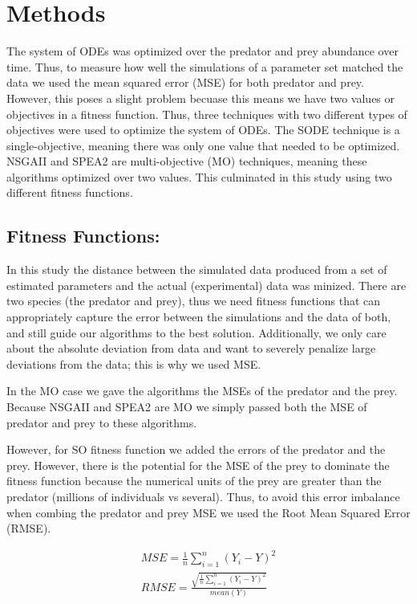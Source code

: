 \documentclass[twocolumn, 12pt]{article}
\begin{document}
\section{Methods}

The system of ODEs was optimized over the predator and prey abundance over time. Thus, to measure how well the simulations of a parameter set matched the data we used the mean squared error (MSE) for both predator and prey. However, this poses a slight problem becuase this means we have two values or objectives in a fitness function. Thus, three techniques with two different types of objectives were used to optimize the system of ODEs. The SODE technique is a single-objective, meaning there was only one value that needed to be optimized. NSGAII and SPEA2 are multi-objective (MO) techniques, meaning these algorithms optimized over two values. This culminated in this study using two different fitness functions. 

\subsection{Fitness Functions:}

In this study the distance between the simulated data produced from a set of estimated parameters and the actual (experimental) data was minized. There are two species (the predator and prey), thus we need fitness functions that can appropriately capture the error between the simulations and the data of both, and still guide our algorithms to the best solution. Additionally, we only care about the absolute deviation from data and want to severely penalize large deviations from the data; this is why we used MSE.

In the MO case we gave the algorithms the MSEs of the predator and the prey. Because NSGAII and SPEA2 are MO we simply passed both the MSE of predator and prey to these algorithms.  

However, for SO fitness function we added the errors of the predator and the prey. However, there is the potential for the MSE of the prey to dominate the fitness function because the numerical units of the prey are greater than the predator (millions of individuals vs several). Thus, to avoid this error imbalance when combing the predator and prey MSE we used the Root Mean Squared Error (RMSE).

\begin{align}
    MSE=\frac{1}{n}\sum_{i=1}^{n} (Y_i - Y)^2 \\
    RMSE=\frac{\sqrt{\frac{1}{n}\sum_{i=1}^{n} (Y_i - Y)^2}}{mean(Y)}
\end{align}
\end{document}
